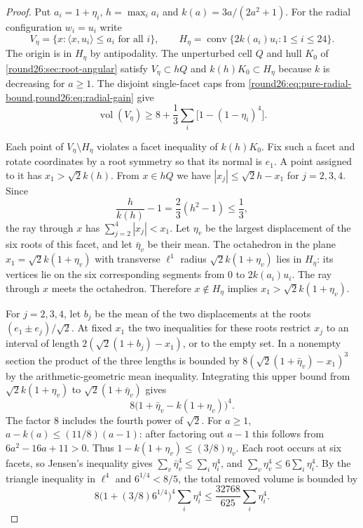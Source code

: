 \begin{proof}
Put $a_i=1+\eta_i$, $h=\max_i a_i$ and $k(a)=3a/(2a^2+1)$.
For the radial configuration $w_i=u_i$ write
\[
 V_\eta=\{x:\langle x,u_i\rangle\le a_i\text{ for all }i\},\qquad
 H_\eta=\operatorname{conv}\{2k(a_i)u_i:1\le i\le24\}.
\]
The origin is in $H_\eta$ by antipodality. The unperturbed cell $Q$
and hull $K_0$ of \cref{round26:sec:root-angular} satisfy
$V_\eta\subset hQ$ and $k(h)K_0\subset H_\eta$ because $k$ is decreasing
for $a\ge1$. The disjoint single-facet caps from
\cref{round26:eq:pure-radial-bound,round26:eq:radial-gain} give
\[
 \operatorname{vol}(V_\eta)
 \ge 8+\frac13\sum_i\bigl[1-(1-\eta_i)^4\bigr].
\]

Each point of $V_\eta\setminus H_\eta$ violates a facet inequality of
$k(h)K_0$. Fix such a facet and rotate coordinates by a root symmetry so
that its normal is $e_1$. A point assigned to it has $x_1>\sqrt2 k(h)$.
From $x\in hQ$ we have $|x_j|\le\sqrt2 h-x_1$ for $j=2,3,4$. Since
\[
 \frac{h}{k(h)}-1=\frac23(h^2-1)\le\frac13,
\]
the ray through $x$ has $\sum_{j=2}^4|x_j|<x_1$. Let
$\eta_v$ be the largest displacement of the six roots of this facet,
and let $\bar\eta_v$ be their mean. The octahedron in the plane
$x_1=\sqrt2 k(1+\eta_v)$ with transverse $\ell^1$ radius
$\sqrt2 k(1+\eta_v)$ lies in $H_\eta$: its vertices lie on the six
corresponding segments from $0$ to $2k(a_i)u_i$. The ray through $x$
meets the octahedron. Therefore $x\notin H_\eta$ implies
$x_1>\sqrt2 k(1+\eta_v)$.

For $j=2,3,4$, let $b_j$ be the mean of the two displacements at the
roots $(e_1\pm e_j)/\sqrt2$. At fixed $x_1$ the two inequalities for
these roots restrict $x_j$ to an interval of length
$2(\sqrt2(1+b_j)-x_1)$, or to the empty set. In a nonempty section
the product of the three lengths is bounded by
$8(\sqrt2(1+\bar\eta_v)-x_1)^3$ by the arithmetic-geometric mean
inequality. Integrating this upper bound from $\sqrt2 k(1+\eta_v)$
to $\sqrt2(1+\bar\eta_v)$ gives
\[
 8\bigl(1+\bar\eta_v-k(1+\eta_v)\bigr)^4 .
\]
The factor $8$ includes the fourth power of $\sqrt2$.
For $a\ge1$, $a-k(a)\le(11/8)(a-1)$: after factoring out $a-1$
this follows from $6a^2-16a+11>0$. Thus
$1-k(1+\eta_v)\le(3/8)\eta_v$. Each root occurs at six facets, so
Jensen's inequality gives $\sum_v\bar\eta_v^4\le\sum_i\eta_i^4$,
and $\sum_v\eta_v^4\le6\sum_i\eta_i^4$. By the triangle inequality
in $\ell^4$ and $6^{1/4}<8/5$, the total removed volume is bounded by
\[
 8\bigl(1+(3/8)6^{1/4}\bigr)^4\sum_i\eta_i^4
 \le\frac{32768}{625}\sum_i\eta_i^4 .
\]


\end{proof}
